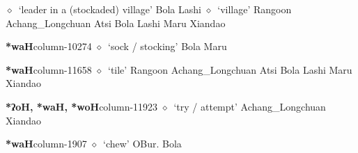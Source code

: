          $\diamond$~`leader in a (stockaded) village'
         Bola 
\hspace{1ex}
         Lashi 
\hspace{1ex}
         $\diamond$~`village'
         Rangoon 
\hspace{1ex}
         Achang\_Longchuan 
\hspace{1ex}
         Atsi 
\hspace{1ex}
         Bola 
\hspace{1ex}
         Lashi 
\hspace{1ex}
         Maru 
\hspace{1ex}
         Xiandao 
  \item {\footnotesize \textbf{*waH}}{\tiny column-10274}
         $\diamond$~`sock / stocking'
         Bola 
\hspace{1ex}
         Maru 
  \item {\footnotesize \textbf{*waH}}{\tiny column-11658}
         $\diamond$~`tile'
         Rangoon 
\hspace{1ex}
         Achang\_Longchuan 
\hspace{1ex}
         Atsi 
\hspace{1ex}
         Bola 
\hspace{1ex}
         Lashi 
\hspace{1ex}
         Maru 
\hspace{1ex}
         Xiandao 
  \item {\footnotesize \textbf{*ʔoH, *waH, *woH}}{\tiny column-11923}
         $\diamond$~`try / attempt'
         Achang\_Longchuan 
\hspace{1ex}
         Xiandao 
  \item {\footnotesize \textbf{*waH}}{\tiny column-1907}
         $\diamond$~`chew'
         OBur. 
\hspace{1ex}
         Bola 
